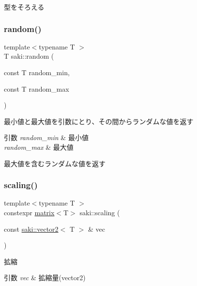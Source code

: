 型をそろえる 

\mbox{\label{namespacesaki_a636caf16f2f00cb734cc867646ac233f}} 
\subsubsection{\texorpdfstring{random()}{random()}}
{\footnotesize\ttfamily template$<$typename T $>$ \\
T saki\+::random (\begin{DoxyParamCaption}\item[{const T}]{random\+\_\+min,  }\item[{const T}]{random\+\_\+max }\end{DoxyParamCaption})}



最小値と最大値を引数にとり、その間からランダムな値を返す 


\begin{DoxyParams}{引数}
{\em random\+\_\+min} & 最小値 \\
\hline
{\em random\+\_\+max} & 最大値\\
\hline
\end{DoxyParams}
最大値を含むランダムな値を返す \mbox{\label{namespacesaki_abda5ab30bf4dc9240857d62d56e590f9}} 
\subsubsection{\texorpdfstring{scaling()}{scaling()}\hspace{0.1cm}{\footnotesize\ttfamily [1/3]}}
{\footnotesize\ttfamily template$<$typename T $>$ \\
constexpr \mbox{\hyperlink{classsaki_1_1matrix}{matrix}}$<$T$>$ saki\+::scaling (\begin{DoxyParamCaption}\item[{const \mbox{\hyperlink{classsaki_1_1vector2}{saki\+::vector2}}$<$ T $>$ \&}]{vec }\end{DoxyParamCaption})}



拡縮 


\begin{DoxyParams}{引数}
{\em vec} & 拡縮量(vector2) \\
\hline
\end{DoxyParams}
\mbox{\label{namespacesaki_affcd920fe27abc17e5fa50f04bfabe05}} 
